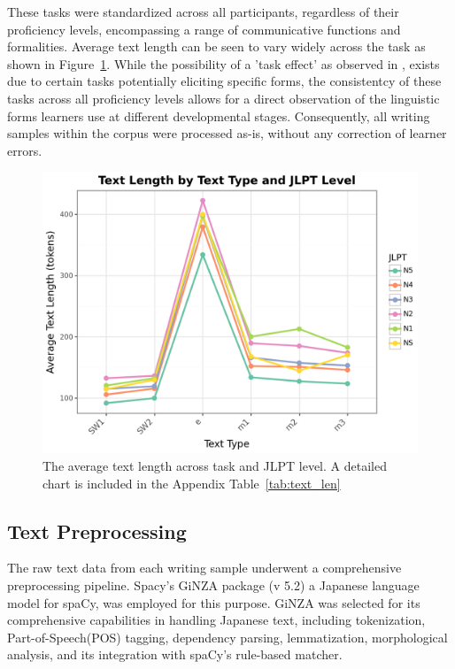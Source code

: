 These tasks were standardized across all participants, regardless of their proficiency levels, encompassing a range
of communicative functions and formalities. Average text length can be seen to vary widely across the task as shown
in Figure~\ref{fig:text-lengths}.
While the possibility of a 'task
effect' as
observed in
\citet{Alexpoulou2017}, exists due to certain tasks potentially eliciting specific forms, the consistentcy of these
tasks across all proficiency levels allows for a direct observation of the linguistic forms learners use at
different developmental stages. Consequently, all writing samples within the corpus were processed as-is, without any
correction of learner
errors.

\begin{figure}[h!]
    \centering
    \includegraphics[scale=.5]{img/text_length_chart}
    \caption[The average text length across task and JLPT level]{The average text length across task and JLPT level. A detailed chart is
    included in the Appendix Table~\ref{tab:text_len}}
    \label{fig:text-lengths}
\end{figure}

\subsection{Text Preprocessing}

The raw text data from each writing sample underwent a comprehensive preprocessing pipeline. Spacy's GiNZA package \cite{Ginza} (v 5.2) a Japanese language model for spaCy,  was employed for this purpose.
GiNZA was selected for its comprehensive capabilities in handling Japanese text, including tokenization,
Part-of-Speech(POS) tagging, dependency parsing, lemmatization, morphological analysis, and its integration with
spaCy's rule-based matcher.

